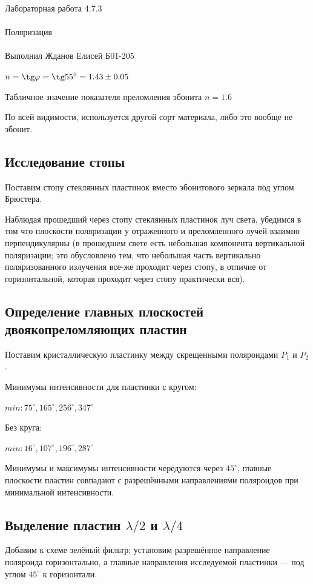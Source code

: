 \documentclass{astroedu-lab}
\begin{document}
\begin{problem}{\huge Лабораторная работа 4.7.3\\\\Поляризация\\\\Выполнил Жданов Елисей Б01-205}
\begin{center}
    $n = \tg \varphi = \tg 55^{\circ} = 1.43 \pm 0.05$
\end{center}

Табличное значение показателя преломления эбонита $n = 1.6$

По всей видимости, используется другой сорт материала, либо это вообще не эбонит.

\subsection{Исследование стопы}

Поставим стопу стеклянных пластинок вместо эбонитового зеркала под углом Брюстера.

Наблюдая прошедший через стопу стеклянных пластинок луч света, убедимся в том что плоскости поляризации у отраженного и преломленного лучей взаимно перпендикулярны (в прошедшем свете есть небольшая компонента вертикальной поляризации; это обусловлено тем, что небольшая часть вертикально поляризованного излучения все-же проходит через стопу, в отличие от горизонтальной, которая проходит через стопу практически вся).

\subsection{Определение главных плоскостей двоякопреломляющих пластин}

Поставим кристаллическую пластинку между скрещенными поляроидами $P_1$ и $P_2$.

Минимумы интенсивности для пластинки с кругом:

$min: 75^{\circ}, 165^{\circ}, 256^{\circ}, 347^{\circ}$

Без круга:

$min: 16^{\circ}, 107^{\circ}, 196^{\circ}, 287^{\circ}$

Минимумы и максимумы интенсивности чередуются через $45^{\circ}$, главные плоскости пластин совпадают с разрешёнными направлениями поляроидов при минимальной интенсивности.

\subsection{Выделение пластин $\lambda/2$ и $\lambda/4$}
Добавим к схеме зелёный фильтр; установим
разрешённое направление поляроида горизонтально, а главные направления исследуемой пластинки — под углом $45^{\circ}$ к горизонтали.


\end{problem}
\end{document}
